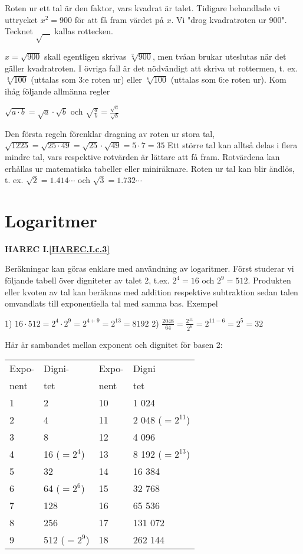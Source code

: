 Roten ur ett tal är den faktor, vars kvadrat är talet.
Tidigare behandlade vi uttrycket $x^2 = 900$ för att få fram värdet på $x$. Vi
"drog kvadratroten ur 900".
Tecknet $\sqrt{\ \ \ \ }$ kallas rottecken.

$x = \sqrt{900}$ skall egentligen skrivas $\sqrt[2]{900}$,
men tvåan brukar uteslutas när det gäller kvadratroten. I övriga fall är det
nödvändigt att skriva ut rottermen, t. ex. $\sqrt[3]{100}$ (uttalas
som 3:e roten ur) eller $\sqrt[6]{100}$ (uttalas som 6:e roten ur).
Kom ihåg följande allmänna regler

$\sqrt{a \cdot b} = \sqrt{a} \cdot \sqrt{b}$ och
$\sqrt{\frac{a}{b}} = \frac{\sqrt{a}}{\sqrt{b}}$

Den första regeln förenklar dragning av roten ur stora tal,
$\sqrt{1225} = \sqrt{25 \cdot 49} = \sqrt{25} \cdot \sqrt{49} = 5 \cdot 7 = 35$
Ett större tal kan alltså delas i flera mindre tal, vars respektive rotvärden är
lättare att få fram. Rotvärdena kan erhållas ur matematiska tabeller eller
miniräknare.
Roten ur tal kan blir ändlös, t. ex.
$\sqrt{2} = 1.414\cdots$ och $\sqrt{3} = 1.732\cdots$

\section{Logaritmer}
\textbf{HAREC I.\ref{HAREC.I.c.3}\label{myHAREC.I.c.3}}

Beräkningar kan göras enklare med användning av logaritmer.
Först studerar vi följande tabell över digniteter av talet 2,
t.ex. $2^4 = 16$ och $2^9 = 512$.
Produkten eller kvoten av tal kan beräknas med addition respektive subtraktion
sedan talen omvandlats till exponentiella tal med samma bas.
Exempel

1) $16 \cdot 512 = 2^4 \cdot 2^9 =2^{4+9} = 2^{13} = 8192$
2) $\frac{2048}{64} = \frac{2^{11}}{2^6} =2^{11-6} =2^5 = 32$

Här är sambandet mellan exponent och dignitet för basen 2:

\begin{tabular}{ll|ll}
Expo- & Digni-       & Expo- & Digni            \\
nent  & tet          & nent  & tet              \\ \hline
1     & 2            & 10    & 1 024            \\
2     & 4            & 11    & 2 048 ($=2^{11}$) \\
3     & 8            & 12    & 4 096            \\
4     & 16 ($=2^4$)  & 13    & 8 192 ($=2^{13}$) \\
5     & 32           & 14    & 16 384           \\
6     & 64 ($=2^6$)  & 15    & 32 768           \\
7     & 128          & 16    & 65 536           \\
8     & 256          & 17    & 131 072          \\
9     & 512 ($=2^9$) & 18    & 262 144
\end{tabular}


